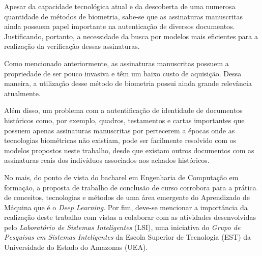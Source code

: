 

Apesar da capacidade tecnológica atual e da descoberta de uma numerosa quantidade de métodos de biometria, sabe-se que as assinaturas manuscritas ainda possuem papel importante na autenticação de diversos documentos. Justificando, portanto, a necessidade da busca por modelos mais eficientes para a realização da verificação dessas assinaturas.

Como mencionado anteriormente, as assinaturas manuscritas possuem a propriedade de ser pouco invasiva e têm um baixo custo de aquisição. Dessa maneira, a utilização desse método de biometria possui ainda grande relevância atualmente.

Além disso, um problema com a autentificação de identidade de documentos históricos como, por exemplo, quadros, testamentos e cartas importantes que possuem apenas assinaturas manuscritas por pertecerem a épocas onde as tecnologias biométricas não existiam, pode ser facilmente resolvido com os modelos propostos neste trabalho, desde que existam outros documentos com as assinaturas reais dos indivíduos associados aos achados históricos.

No mais, do ponto de vista do bacharel em Engenharia de Computação em formação, a proposta de trabalho de conclusão de curso corrobora para a prática de conceitos, tecnologias e métodos de uma área emergente do Aprendizado de Máquina que é o \emph{Deep Learning}. Por fim, deve-se mencionar a importância da realização deste trabalho com vistas a colaborar com as atividades desenvolvidas pelo \emph{Laboratório de Sistemas Inteligentes} (LSI), uma iniciativa do \emph{Grupo de Pesquisas em Sistemas Inteligentes} da Escola Superior de Tecnologia (EST) da Universidade do Estado do Amazonas (UEA).



%
